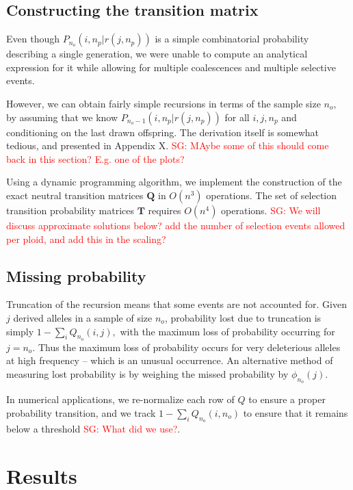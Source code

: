 \documentclass[review]{elsarticle}
\newcommand{\sgcomment}[1]{\textcolor{red}{SG: #1}}
\begin{document}
\subsection{Constructing the transition matrix}

Even though $P_{n_o}(i,n_p | r(j,n_p))$ is a simple combinatorial probability describing a single generation, we were unable to compute 
an analytical expression for it while allowing for multiple coalescences and multiple selective events.  
 
 However, we can obtain fairly simple recursions in terms of the sample size $n_o,$ 
 by assuming that we know   $P_{n_o-1}(i,n_p | r(j,n_p))$ for all $i, j, n_p$ and conditioning on the last drawn
 offspring. The derivation itself is somewhat tedious, and presented in Appendix X. \sgcomment{MAybe some of this should come back in this section? E.g. one of the plots?}
 
 
Using a dynamic
programming algorithm, we implement the construction of the exact neutral transition matrices $\mathbf{Q}$ in 
$O(n^3)$ operations. The set of selection transition probability matrices $\mathbf{T}$ requires $O(n^4)$
operations. \sgcomment{We will discuss approximate solutions below? add the number of selection events allowed per ploid, and add this in the scaling?}


\subsection{Missing probability}

Truncation of the recursion means that some events are not accounted for. Given $j$ derived alleles in a sample of size $n_o$, 
probability lost due to truncation is simply $1- \sum_i Q_{n_o}(i,j),$ with the maximum loss of probability occurring for $j= n_o.$ 
Thus the maximum loss of probability occurs for very deleterious alleles at high frequency -- which is an unusual occurrence. 
An alternative method of measuring lost probability is by weighing the missed probability by $\phi_{n_o}(j)$. 


In numerical applications, we re-normalize each row of $Q$ to ensure a proper probability transition, and we track $1- \sum_i Q_{n_o}(i,n_o)$ 
to ensure that it remains below a threshold \sgcomment{What did we use?}.




 \section{Results}
\label{sec:results}
 
\end{document}

